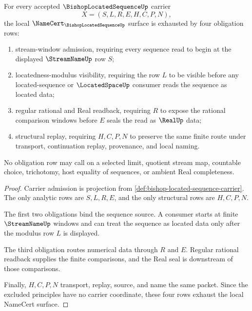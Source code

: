 \begin{theorem}
\label{thm:bishop-located-sequence-namecert-obligations}
For every accepted $\BishopLocatedSequenceUp$ carrier
$$
X=(S,L,R,E,H,C,P,N),
$$
the local $\NameCert_{\BishopLocatedSequenceUp}$ surface is exhausted by four obligation rows:
\begin{enumerate}
\item stream-window admission, requiring every sequence read to begin at the displayed $\StreamNameUp$ row $S$;
\item locatedness-modulus visibility, requiring the row $L$ to be visible before any located-sequence or $\LocatedSpaceUp$ consumer reads the sequence as located data;
\item regular rational and Real readback, requiring $R$ to expose the rational comparison windows before $E$ seals the read as $\RealUp$ data;
\item structural replay, requiring $H,C,P,N$ to preserve the same finite route under transport, continuation replay, provenance, and local naming.
\end{enumerate}
No obligation row may call on a selected limit, quotient stream map, countable choice, trichotomy, host equality of sequences, or ambient Real completeness.
\end{theorem}
\begin{proof}
Carrier admission is projection from \autoref{def:bishop-located-sequence-carrier}. The only analytic rows are $S,L,R,E$, and the only structural rows are $H,C,P,N$.

The first two obligations bind the sequence source. A consumer starts at finite $\StreamNameUp$ windows and can treat the sequence as located data only after the modulus row $L$ is displayed.

The third obligation routes numerical data through $R$ and $E$. Regular rational readback supplies the finite comparisons, and the Real seal is downstream of those comparisons.

Finally, $H,C,P,N$ transport, replay, source, and name the same packet. Since the excluded principles have no carrier coordinate, these four rows exhaust the local NameCert surface.
\end{proof}

